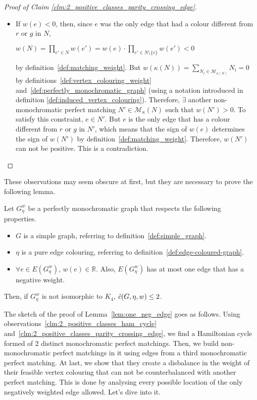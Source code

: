 \begin{proof}[Proof of Claim \ref{clm:2_positive_classes_parity_crossing_edge}]
\begin{itemize}
        \item If $w(e) < 0$, then, since $e$ was the only edge that had a colour different from $r$ or $g$ in $N$,
        \begin{center}
            $w(N) = \prod\limits_{e' \in N} w(e') = w(e) \cdot \prod\limits_{e' \in N \setminus \{e\}} w(e') < 0$
        \end{center}
        by definition~\ref{def:matching_weight}.
        But $w(\kappa(N)) = \sum\limits_{N_i \in \mathcal{M}_{\kappa(N)}} N_i = 0$ by definitions~\ref{def:vertex_colouring_weight} and~\ref{def:perfectly_monochromatic_graph} (using a notation introduced in definition \ref{def:induced_vertex_colouring}).
        Therefore, $\exists$ another non-monochromatic perfect matching $N' \in \mathcal{M}_\kappa(N)$ such that $w(N') > 0$.
        To satisfy this constraint, $e \in N'$.
        But $e$ is the only edge that has a colour different from $r$ or $g$ in $N'$, which means that the sign of $w(e)$ determines the sign of $w(N')$ by definition~\ref{def:matching_weight}.
        Therefore, $w(N')$ can not be positive.
        This is a contradiction.

    \end{itemize}
\end{proof}

These observations may seem obscure at first, but they are necessary to prove the following lemma.

\begin{lemma}
    \label{lem:one_neg_edge}
    Let $G_\eta^w$ be a perfectly monochromatic graph that respects the following properties.
    \begin{itemize}
        \item $G$ is a simple graph, referring to definition~\ref{def:simple_graph}.
        \item $\eta$ is a pure edge colouring, referring to definition~\ref{def:edge-coloured-graph}.
        \item $\forall e \in E(G_\eta^w)$, $w(e) \in \mathbb{R}$.
        Also, $E(G_\eta^w)$ has at most one edge that has a negative weight.
    \end{itemize}
    Then, if $G_\eta^w$ is not isomorphic to $K_4$, $\Tilde{c}(G, \eta, w) \leq 2$.
\end{lemma}

The sketch of the proof of Lemma~\ref{lem:one_neg_edge} goes as follows.
Using observations~\ref{clm:2_positive_classes_ham_cycle} and~\ref{clm:2_positive_classes_parity_crossing_edge}, we find a Hamiltonian cycle formed of $2$ distinct monochromatic perfect matchings.
Then, we build non-monochromatic perfect matchings in it using edges from a third monochromatic perfect matching.
At last, we show that they create a disbalance in the weight of their feasible vertex colouring that can not be counterbalanced with another perfect matching.
This is done by analysing every possible location of the only negatively weighted edge allowed.
Let's dive into it.

